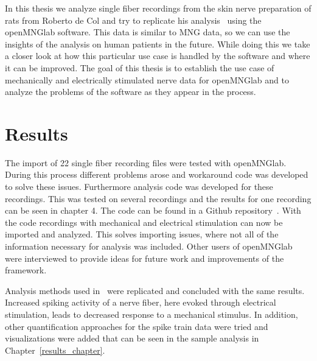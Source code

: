 In this thesis we analyze single fiber recordings from the skin nerve preparation of rats from Roberto de Col and try to replicate his analysis~\cite{roberto} using the openMNGlab software. This data is similar to MNG data, so we can use the insights of the analysis on human patients in the future. While doing this we take a closer look at how this particular use case is handled by the software and where it can be improved.
The goal of this thesis is to establish the use case of mechanically and electrically stimulated nerve data for openMNGlab and to analyze the problems of the software as they appear in the process.

\section{Results}
The import of 22 single fiber recording files were tested with openMNGlab. During this process different problems arose and workaround code was developed to solve these issues. Furthermore analysis code was developed for these recordings. This was tested on several recordings and the results for one recording can be seen in chapter 4. The code can be found in a Github repository~\cite{code}. With the code recordings with mechanical and electrical stimulation can now be imported and analyzed. This solves importing issues, where not all of the information necessary for analysis was included. Other users of openMNGlab were interviewed to provide ideas for future work and improvements of the framework.

Analysis methods used in~\cite{roberto} were replicated and concluded with the same results. Increased spiking activity of a nerve fiber, here evoked through electrical stimulation, leads to decreased response to a mechanical stimulus. In addition, other quantification approaches for the spike train data were tried and visualizations were added that can be seen in the sample analysis in Chapter~\ref{results_chapter}.

